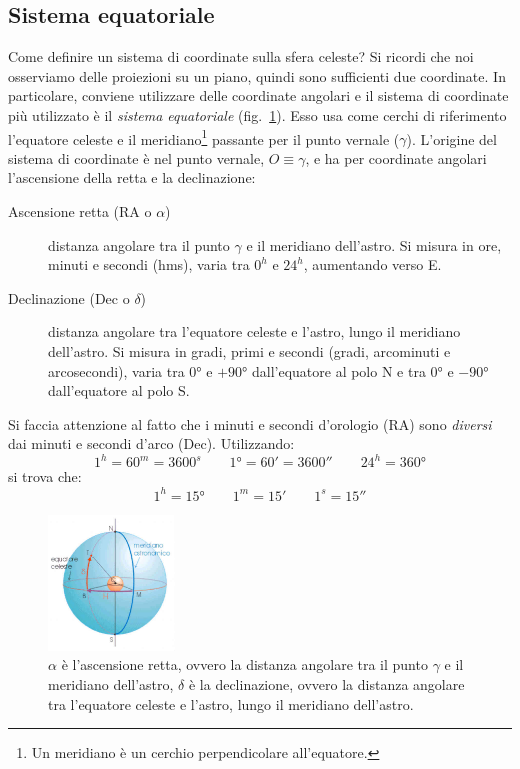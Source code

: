 \subsection{Sistema equatoriale}
Come definire un sistema di coordinate sulla sfera celeste? Si ricordi che noi osserviamo delle proiezioni su un piano, quindi sono sufficienti due coordinate. In particolare, conviene utilizzare delle coordinate angolari e il sistema di coordinate più utilizzato è il \emph{sistema equatoriale} (fig.~\ref{fig:sistema-equatoriale}). Esso usa come cerchi di riferimento l'equatore celeste e il meridiano\footnote{Un meridiano è un cerchio perpendicolare all'equatore.} passante per il punto vernale ($\gamma$). L'origine del sistema di coordinate è nel punto vernale, $O \equiv \gamma$, e ha per coordinate angolari l'ascensione della retta e la declinazione:
\begin{description}
    \item[Ascensione retta (RA o $\alpha$)] distanza angolare tra il punto $\gamma$ e il meridiano dell'astro. Si misura in ore, minuti e secondi (hms), varia tra $0^h$ e $24^h$, aumentando verso E.
    \item[Declinazione (Dec o $\delta$)] distanza angolare tra l'equatore celeste e l'astro, lungo il meridiano dell'astro. Si misura in gradi, primi e secondi (gradi, arcominuti e arcosecondi), varia tra $\ang{0}$ e $+\ang{90}$ dall'equatore al polo N e tra $\ang{0}$ e $-\ang{90}$ dall'equatore al polo S.
\end{description}
Si faccia attenzione al fatto che i minuti e secondi d'orologio (RA) sono \emph{diversi} dai minuti e secondi d'arco (Dec). Utilizzando:
\[
    1^h = 60^m = 3600^s \qquad \ang{1} = 60' = 3600'' \qquad 24^h = \ang{360}
\]
si trova che:
\[
    1^h = \ang{15} \qquad 1^m = 15' \qquad 1^s = 15''
\]

\begin{figure}
\centering
\includegraphics[width=0.3\textwidth]{immagini/sistema-equatoriale.jpg}
\caption{$\alpha$ è l'ascensione retta, ovvero la distanza angolare tra il punto $\gamma$ e il meridiano dell'astro, $\delta$ è la declinazione, ovvero la distanza angolare tra l'equatore celeste e l'astro, lungo il meridiano dell'astro.}
\label{fig:sistema-equatoriale}
\end{figure}

